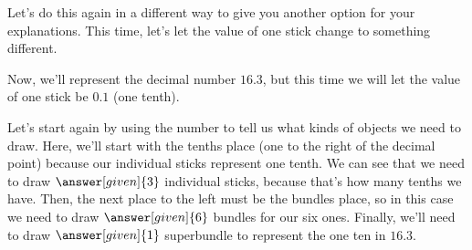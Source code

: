 \documentclass{ximera}
\begin{document}
Let's do this again in a different way to give you another option for your explanations. This time, let's let the value of one stick change to something different. 

\begin{example}
Now, we'll represent the decimal number $16.3$, but this time we will let the value of one stick be $0.1$ (one tenth).

Let's start again by using the number to tell us what kinds of objects we need to draw. Here, we'll start with the tenths place (one to the right of the decimal point) because our individual sticks represent one tenth. We can see that we need to draw $\answer[given]{3}$ individual sticks, because that's how many tenths we have. Then, the next place to the left must be the bundles place, so in this case we need to draw $\answer[given]{6}$ bundles for our six ones. Finally, we'll need to draw $\answer[given]{1}$ superbundle to represent the one ten in $16.3$.

\end{example}
\end{document}
